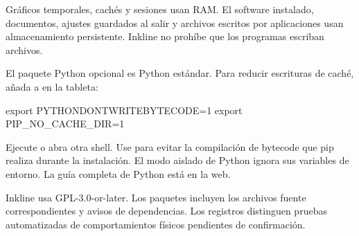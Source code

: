 Gráficos temporales, cachés y sesiones usan RAM. El software instalado,
documentos, ajustes guardados al salir y archivos escritos por aplicaciones
usan almacenamiento persistente. Inkline no prohíbe que los programas escriban archivos.

El paquete Python opcional es Python estándar. Para reducir escrituras de
caché, añada a  en la tableta:
\begin{shell}
export PYTHONDONTWRITEBYTECODE=1
export PIP_NO_CACHE_DIR=1
\end{shell}
Ejecute  o abra otra shell. Use
 para evitar la compilación
de bytecode que pip realiza durante la instalación. El modo aislado de Python
ignora sus variables de entorno. La guía completa de Python está en la web.

Inkline usa GPL-3.0-or-later. Los paquetes incluyen los archivos fuente
correspondientes y avisos de dependencias. Los registros distinguen pruebas
automatizadas de comportamientos físicos pendientes de confirmación.
